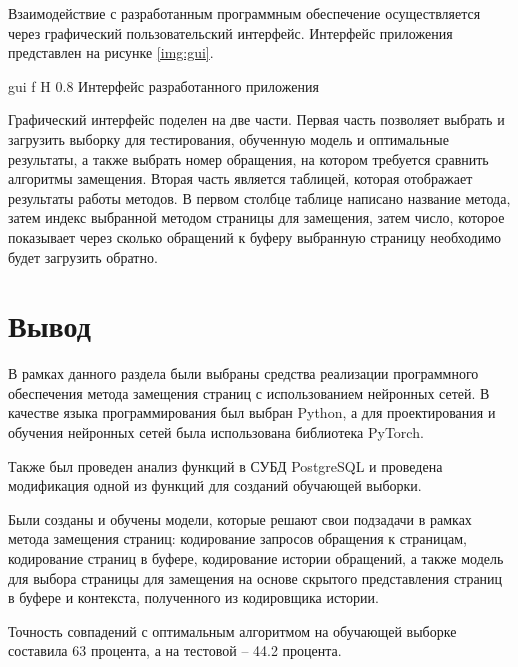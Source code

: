 Взаимодействие с разработанным программным обеспечение осуществляется через графический пользовательский интерфейс. Интерфейс приложения представлен на рисунке \ref{img:gui}.

{gui} %
{f} %
{H} %
{0.8\textwidth} %
{Интерфейс разработанного приложения} %


Графический интерфейс поделен на две части.
Первая часть позволяет выбрать и загрузить выборку для тестирования, обученную модель и оптимальные результаты, а также выбрать номер обращения, на котором требуется сравнить алгоритмы замещения.
Вторая часть является таблицей, которая отображает результаты работы методов.
В первом столбце таблице написано название метода, затем индекс выбранной методом страницы для замещения, затем число, которое показывает через сколько обращений к буферу выбранную страницу необходимо будет загрузить обратно.

\section{Вывод}

В рамках данного раздела были выбраны средства реализации программного обеспечения метода замещения страниц с использованием нейронных сетей.
В качестве языка программирования был выбран Python, а для проектирования и обучения нейронных сетей была использована библиотека PyTorch. 

Также был проведен анализ функций в СУБД PostgreSQL и проведена модификация одной из функций для созданий обучающей выборки.

Были созданы и обучены модели, которые решают свои подзадачи в рамках метода замещения страниц: кодирование запросов обращения к страницам, кодирование страниц в буфере, кодирование истории обращений, а также модель для выбора страницы для замещения на основе скрытого представления страниц в буфере и контекста, полученного из кодировщика истории.

Точность совпадений с оптимальным алгоритмом на обучающей выборке составила 63 процента, а на тестовой -- 44.2 процента.